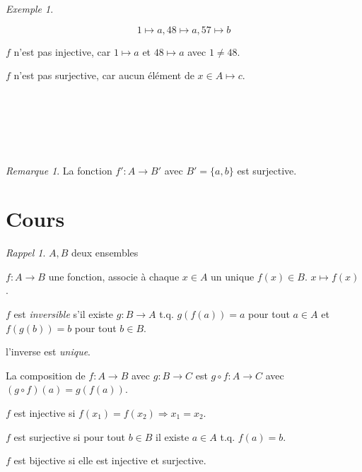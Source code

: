 \documentclass{report}
\newcounter{cours}
\newcommand*{\cours}{\section*{Cours \thecours}\stepcounter{cours}}
\theoremstyle{definition}
\theoremstyle{remark}
\newtheorem*{exem}{Exemple}
\newtheorem*{rema}{Remarque}
\newtheorem*{rappel}{Rappel}
\begin{document}
\begin{exem}
\begin{ulist}
			\[
			1 \mapsto a, 48 \mapsto a, 57 \mapsto b
			\]

			$f$ n'est pas injective, car $1 \mapsto a$ et $48 \mapsto a$  avec $1 \neq 48$.

			$f$ n'est pas surjective, car aucun \'el\'ement de $x \in A \mapsto c$.
		\end{ulist}


		~



		~



		~


	\end{exem}

	\begin{rema}
		La fonction $f':A \to B'$ avec $B'=\{a,b\}$ est surjective.
	\end{rema}


	\cours
	\begin{rappel}
		$A, B$ deux ensembles

		\begin{ulist}[noitemsep]
			\item $f:A \to B$ une fonction, associe \`a chaque $x \in A$ un unique $f(x) \in B$. $x \mapsto f(x)$.
			\item $f$ est \emph{inversible} s'il existe $g:B \to A$ t.q. $g(f(a))=a$ pour tout $a \in A$ et $f(g(b))=b$ pour tout $b \in B$.
			\item l'inverse est \emph{unique}.
			\item La composition de $f:A \to B$ avec $g:B \to C$ est $g \circ f:A \to C$ avec $(g \circ f)(a)=g(f(a))$.
			\item $f$ est injective si $f(x_1)=f(x_2) \Rightarrow x_1=x_2$.
			\item $f$ est surjective si pour tout $b \in B$ il existe $a \in A$ t.q. $f(a)=b$.
			\item $f$ est bijective si elle est injective et surjective.
		\end{ulist}
	\end{rappel}
\end{document}
